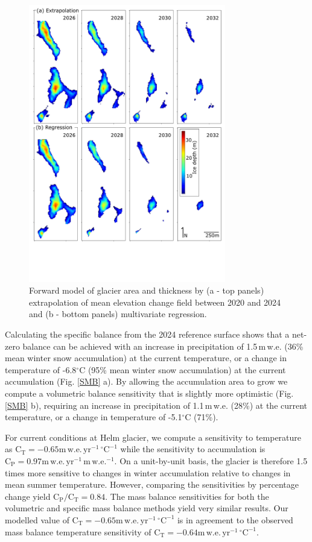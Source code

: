 \documentclass[annals,review,oneside]{igs}
\begin{document}
\begin{figure}[H]
\centering
\includegraphics[width=86mm,trim=0cm 4.3cm 0cm 0cm, clip=true]
{forward.pdf}
\caption{Forward model of glacier area and thickness by (a - top panels) extrapolation of mean elevation change field between 2020 and 2024 and (b - bottom panels) multivariate regression.}
\label{loss_map}
\end{figure}

Calculating the specific balance from the 2024 reference surface shows that a net-zero balance can be achieved with an increase in precipitation of 1.5\,m\,w.e. (36\% mean winter snow accumulation) at the current temperature, or a change in temperature of -6.8$^\circ$C (95\% mean winter snow accumulation) at the current accumulation (Fig. \ref{SMB} a). By allowing the accumulation area to grow we compute a volumetric balance sensitivity that is slightly more optimistic (Fig. \ref{SMB} b), requiring an increase in precipitation of 1.1\,m\,w.e. (28\%) at the current temperature, or a change in temperature of -5.1$^\circ$C (71\%). 

For current conditions at Helm glacier, we compute a sensitivity to temperature as $\mathrm{C_T = -0.65 m\,w.e.\,yr^{-1}\,^\circ C^{-1}}$ while the sensitivity to accumulation is $\mathrm{C_P = 0.97 m\,w.e.\,yr^{-1}\,m\,w.e.^{-1}}$. On a unit-by-unit basis, the glacier is therefore 1.5 times more sensitive to changes in winter accumulation relative to changes in mean summer temperature. However, comparing the sensitivities by percentage change yield $\mathrm{C_P/C_T}=0.84$. The mass balance sensitivities for both the volumetric and specific mass balance methods yield very similar results. Our modelled value of $\mathrm{C_T = -0.65 m\,w.e.\,yr^{-1}\,^\circ C^{-1}}$ is in agreement to the observed mass balance temperature sensitivity of $\mathrm{C_T = -0.64 m\,w.e.\,yr^{-1}\,^\circ C^{-1}}$. 
\end{document}
